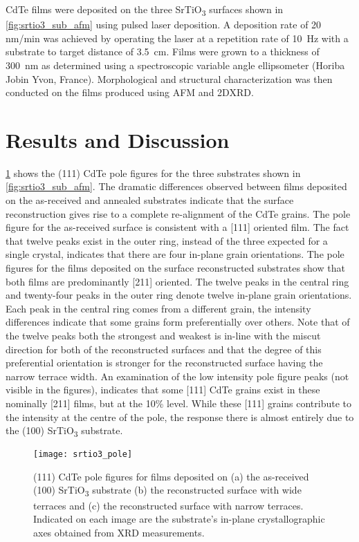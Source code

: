 CdTe films were deposited on the three SrTiO\textsubscript{3} surfaces shown
in \cref{fig:srtio3_sub_afm} using pulsed laser deposition. A deposition rate of 20 nm/min was achieved by
operating the laser at a repetition rate of 10~Hz with a substrate to
target distance of 3.5~cm. Films were grown to
a thickness of 300~nm as determined using a spectroscopic variable
angle ellipsometer (Horiba Jobin Yvon, France). Morphological and
structural characterization was then conducted on the films
produced using AFM and 2DXRD.
\section{Results and Discussion}
\cref{fig:srtio3_pole} shows the (111) CdTe pole figures for the three substrates
shown in \cref{fig:srtio3_sub_afm}. The dramatic differences observed between films
deposited on the as-received and annealed substrates indicate that
the surface reconstruction gives rise to a complete re-alignment of
the CdTe grains. The pole figure for the as-received surface is
consistent with a [111] oriented film. The fact that twelve peaks
exist in the outer ring, instead of the three expected for a single
crystal, indicates that there are four in-plane grain orientations.
The pole figures for the films deposited on the surface reconstructed substrates show that both films are predominantly [211]
oriented. The twelve peaks in the central ring and twenty-four
peaks in the outer ring denote twelve in-plane grain orientations. Each peak in the central ring comes from a different grain, the intensity differences indicate that some grains form
preferentially over others. Note that of the twelve peaks both
the strongest and weakest is in-line with the miscut direction for
both of the reconstructed surfaces and that the degree of this
preferential orientation is stronger for the reconstructed surface
having the narrow terrace width. An examination of the low
intensity pole figure peaks (not visible in the figures), indicates that
some [111] CdTe grains exist in these nominally [211] films, but
at the 10\% level. While these [111] grains contribute to
the intensity at the centre of the pole, the response there is almost
entirely due to the (100) SrTiO\textsubscript{3} substrate.
\begin{figure}
    \centering
    \texttt{[image: srtio3\_pole]}
    \caption[Pole figures of CdTe grown on SrTiO\textsubscript{3}]{\label{fig:srtio3_pole}(111) CdTe pole figures for films deposited on (a) the as-received (100) SrTiO\textsubscript{3} substrate (b) the reconstructed surface with wide terraces and (c) the reconstructed surface with narrow terraces. Indicated on each image are the substrate’s in-plane crystallographic axes obtained from XRD measurements.}
\end{figure}
